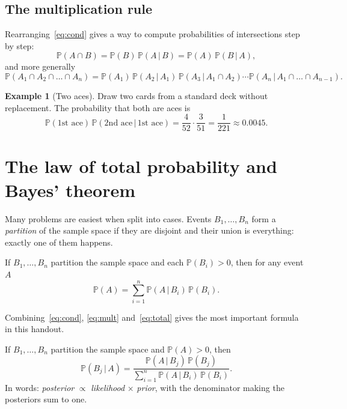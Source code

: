 \documentclass[11pt,letterpaper]{article}
\theoremstyle{definition}
\newtheorem{example}{Example}
\theoremstyle{plain}
\newcommand{\Prob}{\mathbb{P}}
\newcommand{\given}{\,\vert\,}
\begin{document}
\subsection{The multiplication rule}

Rearranging~\eqref{eq:cond} gives a way to compute probabilities of intersections step by step:
\begin{equation}\label{eq:mult}
  \Prob(A \cap B) = \Prob(B)\,\Prob(A \given B) = \Prob(A)\,\Prob(B \given A),
\end{equation}
and more generally
\[
  \Prob(A_1 \cap A_2 \cap \dots \cap A_n) = \Prob(A_1)\,\Prob(A_2 \given A_1)\,\Prob(A_3 \given A_1 \cap A_2)\cdots\Prob(A_n \given A_1 \cap \dots \cap A_{n-1}).
\]

\begin{example}[Two aces]
Draw two cards from a standard deck without replacement. The probability that both are aces is
\[
  \Prob(\text{1st ace})\,\Prob(\text{2nd ace} \given \text{1st ace}) = \frac{4}{52}\cdot\frac{3}{51} = \frac{1}{221} \approx 0.0045.
\]
\end{example}

\section{The law of total probability and Bayes' theorem}

Many problems are easiest when split into cases. Events $B_1, \dots, B_n$ form a \emph{partition} of the sample space if they are disjoint and their union is everything: exactly one of them happens.

\begin{keybox}
If $B_1, \dots, B_n$ partition the sample space and each $\Prob(B_i) > 0$, then for any event $A$
\begin{equation}\label{eq:total}
  \Prob(A) = \sum_{i=1}^{n} \Prob(A \given B_i)\,\Prob(B_i).
\end{equation}
\end{keybox}

Combining~\eqref{eq:cond}, \eqref{eq:mult} and~\eqref{eq:total} gives the most important formula in this handout.

\begin{keybox}
If $B_1, \dots, B_n$ partition the sample space and $\Prob(A) > 0$, then
\begin{equation}\label{eq:bayes}
  \Prob(B_j \given A) = \frac{\Prob(A \given B_j)\,\Prob(B_j)}{\sum_{i=1}^{n}\Prob(A \given B_i)\,\Prob(B_i)}.
\end{equation}
In words: \emph{posterior} $\propto$ \emph{likelihood} $\times$ \emph{prior}, with the denominator making the posteriors sum to one.
\end{keybox}
\end{document}
